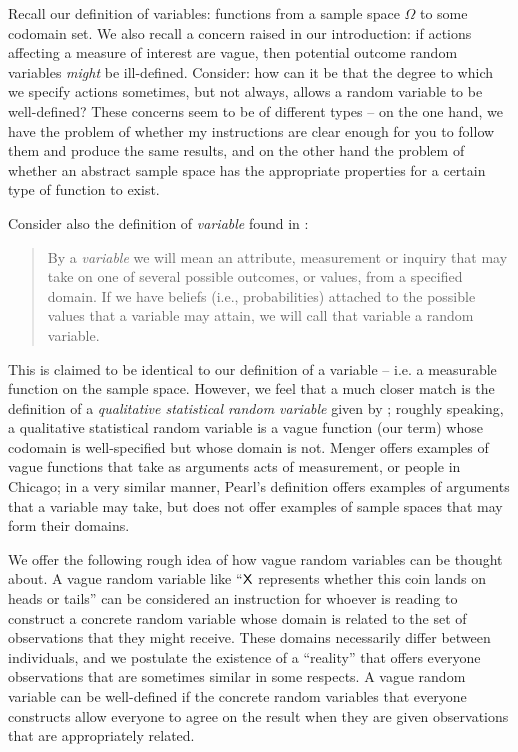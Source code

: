 Recall our definition of variables: functions from a sample space $\Omega$ to some codomain set. We also recall a concern raised in our introduction: if actions affecting a measure of interest are vague, then potential outcome random variables \emph{might} be ill-defined. Consider: how can it be that the degree to which we specify actions sometimes, but not always, allows a random variable to be well-defined? These concerns seem to be of different types -- on the one hand, we have the problem of whether my instructions are clear enough for you to follow them and produce the same results, and on the other hand the problem of whether an abstract sample space has the appropriate properties for a certain type of function to exist.

Consider also the definition of \emph{variable} found in \citet{pearl_causality:_2009}:

\begin{quote}
By a \emph{variable} we will mean an attribute, measurement or inquiry that may take on one of several possible outcomes, or values, from a specified domain. If we have beliefs (i.e., probabilities) attached to the possible values that a variable may attain, we will call that variable a random variable.
\end{quote}

This is claimed to be identical to our definition of a variable -- i.e. a measurable function on the sample space. However, we feel that a much closer match is the definition of a \emph{qualitative statistical random variable} given by \citet{menger_random_2003}; roughly speaking, a qualitative statistical random variable is a vague function (our term) whose codomain is well-specified but whose domain is not. Menger offers examples of vague functions that take as arguments acts of measurement, or people in Chicago; in a very similar manner, Pearl's definition offers examples of arguments that a variable may take, but does not offer examples of sample spaces that may form their domains.

We offer the following rough idea of how vague random variables can be thought about. A vague random variable like ``$\mathsf{X}$ represents whether this coin lands on heads or tails'' can be considered an instruction for whoever is reading to construct a concrete random variable whose domain is related to the set of observations that they might receive. These domains necessarily differ between individuals, and we postulate the existence of a ``reality'' that offers everyone observations that are sometimes similar in some respects. A vague random variable can be well-defined if the concrete random variables that everyone constructs allow everyone to agree on the result when they are given observations that are appropriately related.

